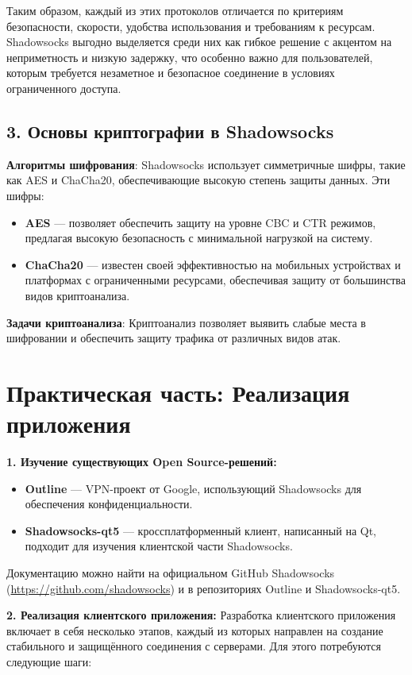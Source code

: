 \documentclass[a4paper,12pt]{article}
\begin{document}
Таким образом, каждый из этих протоколов отличается по критериям безопасности, скорости, удобства использования и требованиям к ресурсам. Shadowsocks выгодно выделяется среди них как гибкое решение с акцентом на неприметность и низкую задержку, что особенно важно для пользователей, которым требуется незаметное и безопасное соединение в условиях ограниченного доступа.

\subsection*{3. Основы криптографии в Shadowsocks}

\textbf{Алгоритмы шифрования}: Shadowsocks использует симметричные шифры, такие как AES и ChaCha20, обеспечивающие высокую степень защиты данных. Эти шифры:
\begin{itemize}
    \item \textbf{AES} --- позволяет обеспечить защиту на уровне CBC и CTR режимов, предлагая высокую безопасность с минимальной нагрузкой на систему.
    \item \textbf{ChaCha20} --- известен своей эффективностью на мобильных устройствах и платформах с ограниченными ресурсами, обеспечивая защиту от большинства видов криптоанализа.
\end{itemize}

\textbf{Задачи криптоанализа}: Криптоанализ позволяет выявить слабые места в шифровании и обеспечить защиту трафика от различных видов атак.

\newpage

\section*{Практическая часть: Реализация приложения}

\textbf{1. Изучение существующих Open Source-решений:}
\begin{itemize}
    \item \textbf{Outline} --- VPN-проект от Google, использующий Shadowsocks для обеспечения конфиденциальности.
    \item \textbf{Shadowsocks-qt5} --- кроссплатформенный клиент, написанный на Qt, подходит для изучения клиентской части Shadowsocks.
\end{itemize}
Документацию можно найти на официальном GitHub Shadowsocks (\url{https://github.com/shadowsocks}) и в репозиториях Outline и Shadowsocks-qt5.

\textbf{2. Реализация клиентского приложения:}  
Разработка клиентского приложения включает в себя несколько этапов, каждый из которых направлен на создание стабильного и защищённого соединения с серверами. Для этого потребуются следующие шаги:
\end{document}

